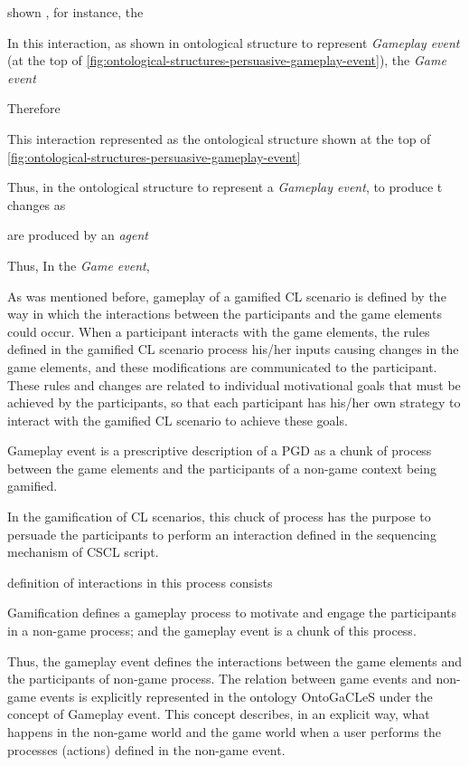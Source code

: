  shown ,  for instance, the 


In this interaction, as shown in ontological structure to represent \emph{Gameplay event} (at the top of \autoref{fig:ontological-structures-persuasive-gameplay-event}), the \emph{Game event} 









 Therefore

This interaction represented as the ontological structure shown at the top of \autoref{fig:ontological-structures-persuasive-gameplay-event}



Thus, in the ontological structure to represent a \emph{Gameplay event},  to produce t changes as 

are produced by an \emph{agent} 


Thus,  In the \emph{Game event}, 


As was mentioned before, gameplay of a gamified CL scenario is defined by the way in which the interactions between the participants and the game elements could occur. When a participant interacts with the game elements, the rules defined in the gamified CL scenario process his/her inputs causing changes in the game elements, and these modifications are communicated to the participant. These rules and changes are related to individual motivational goals that must be achieved by the participants, so that each participant has his/her own strategy to interact with the gamified CL scenario to achieve these goals. 


Gameplay event is a prescriptive description of a PGD as a chunk of process between the game elements and the participants of a non-game context being gamified.

In the gamification of CL scenarios, this chuck of process has the purpose to persuade the participants to perform an interaction defined in the sequencing mechanism of CSCL script. 

definition of interactions in this process consists 

Gamification defines a gameplay process to motivate and engage the participants in a non-game process; and the gameplay event is a chunk of this process.

Thus, the gameplay event defines the interactions between the game elements and the participants of non-game process. The relation between game events and non-game events is explicitly represented in the ontology OntoGaCLeS under the concept of Gameplay event. This concept describes, in an explicit way, what happens in the non-game world and the game world when a user performs the processes (actions) defined in the non-game event.


